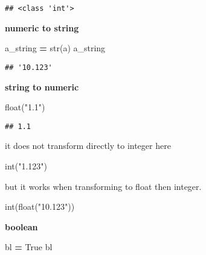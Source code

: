 \documentclass[
]{book}
\newenvironment{Shaded}{\begin{snugshade}}{\end{snugshade}}
\newcommand{\BuiltInTok}[1]{#1}
\newcommand{\NormalTok}[1]{#1}
\newcommand{\OperatorTok}[1]{\textcolor[rgb]{0.81,0.36,0.00}{\textbf{#1}}}
\newcommand{\StringTok}[1]{\textcolor[rgb]{0.31,0.60,0.02}{#1}}
\newcommand{\VariableTok}[1]{\textcolor[rgb]{0.00,0.00,0.00}{#1}}
\begin{document}
\begin{verbatim}
## <class 'int'>
\end{verbatim}

\textbf{numeric to string}

\begin{Shaded}
\begin{Highlighting}[]
\NormalTok{a\_string }\OperatorTok{=} \BuiltInTok{str}\NormalTok{(a)}
\NormalTok{a\_string}
\end{Highlighting}
\end{Shaded}

\begin{verbatim}
## '10.123'
\end{verbatim}

\textbf{string to numeric}

\begin{Shaded}
\begin{Highlighting}[]
\BuiltInTok{float}\NormalTok{(}\StringTok{"1.1"}\NormalTok{)}
\end{Highlighting}
\end{Shaded}

\begin{verbatim}
## 1.1
\end{verbatim}

it does not transform directly to integer here

\begin{Shaded}
\begin{Highlighting}[]
\BuiltInTok{int}\NormalTok{(}\StringTok{"1.123"}\NormalTok{)}
\end{Highlighting}
\end{Shaded}

but it works when transforming to float then integer.

\begin{Shaded}
\begin{Highlighting}[]
\BuiltInTok{int}\NormalTok{(}\BuiltInTok{float}\NormalTok{(}\StringTok{"10.123"}\NormalTok{))}
\end{Highlighting}
\end{Shaded}

\textbf{boolean}

\begin{Shaded}
\begin{Highlighting}[]
\NormalTok{bl }\OperatorTok{=} \VariableTok{True}
\NormalTok{bl}
\end{Highlighting}
\end{Shaded}
\end{document}
